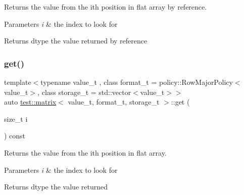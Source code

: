 Returns the value from the ith position in flat array by reference. 


\begin{DoxyParams}{Parameters}
{\em i} & the index to look for \\
\hline
\end{DoxyParams}
\begin{DoxyReturn}{Returns}
dtype the value returned by reference 
\end{DoxyReturn}
\mbox{\label{classtest_1_1matrix_a30b5e83cc4d03d78c9df3b9aea4808fd}} 
\subsubsection{\texorpdfstring{get()}{get()}\hspace{0.1cm}{\footnotesize\ttfamily [2/4]}}
{\footnotesize\ttfamily template$<$typename value\+\_\+t , class format\+\_\+t  = policy\+::\+Row\+Major\+Policy$<$value\+\_\+t$>$, class storage\+\_\+t  = std\+::vector$<$value\+\_\+t$>$$>$ \\
auto \mbox{\hyperlink{classtest_1_1matrix}{test\+::matrix}}$<$ value\+\_\+t, format\+\_\+t, storage\+\_\+t $>$\+::get (\begin{DoxyParamCaption}\item[{size\+\_\+t}]{i }\end{DoxyParamCaption}) const\hspace{0.3cm}{\ttfamily [inline]}}



Returns the value from the ith position in flat array. 


\begin{DoxyParams}{Parameters}
{\em i} & the index to look for \\
\hline
\end{DoxyParams}
\begin{DoxyReturn}{Returns}
dtype the value returned 
\end{DoxyReturn}
\mbox{\label{classtest_1_1matrix_ad101d663d9026d4a09aeae44350f4842}} 
